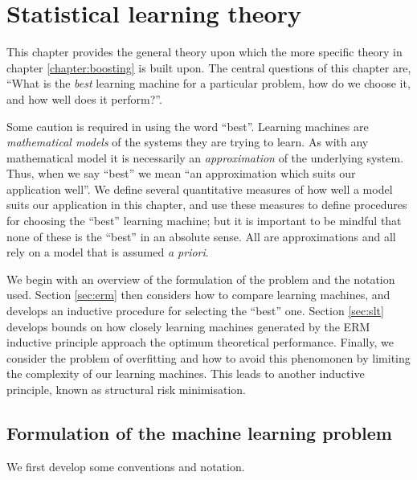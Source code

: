 
\chapter{Statistical learning theory}
\label{chapter:slt}

This chapter provides the general theory upon which the more specific
theory in chapter \ref{chapter:boosting} is built upon.  The central
questions of this chapter are, ``What is the \emph{best} learning
machine for a particular problem, how do we choose it, and how well
does it perform?''.

Some caution is required in using the word ``best''.  Learning
machines are \emph{mathematical models} of the systems they are trying
to learn.  As with any mathematical model it is necessarily an
\emph{approximation} of the underlying system.  Thus, when we say
``best'' we mean ``an approximation which suits our application
well''.  We define several quantitative measures of how well a model
suits our application in this chapter, and use these measures to
define procedures for choosing the ``best'' learning machine; but it
is important to be mindful that none of these is the ``best'' in an
absolute sense.  All are approximations and all rely on a model that
is assumed \emph{a priori}.

We begin with an overview of the formulation of the problem and the
notation used.  Section \ref{sec:erm} then considers how to compare
learning machines, and develops an inductive procedure for selecting
the ``best'' one.  Section \ref{sec:slt} develops bounds on how closely
learning machines generated by the ERM inductive principle approach
the optimum theoretical performance.  Finally, we consider the problem
of overfitting and how to avoid this phenomonen by limiting the
complexity of our learning machines.  This leads to another inductive
principle, known as structural risk minimisation.

\section{Formulation of the machine learning problem}
\label{sec:formulation}

We first develop some conventions and notation.

